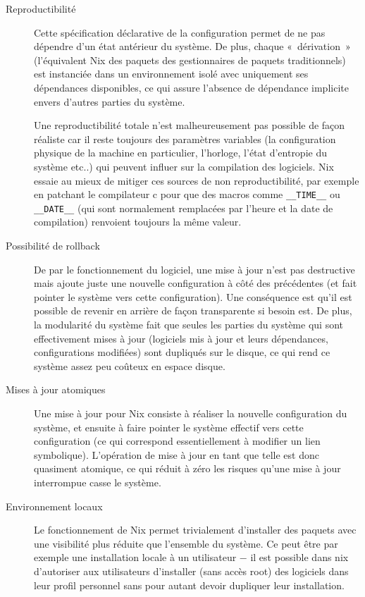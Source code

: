 \begin{description}
  \item[Reproductibilité] Cette spécification déclarative de la configuration
    permet de ne pas dépendre d'un état antérieur du système.
    De plus, chaque « dérivation » (l'équivalent Nix des paquets des
    gestionnaires de paquets traditionnels) est instanciée dans un
    environnement isolé avec uniquement ses dépendances disponibles, ce qui
    assure l'absence de dépendance implicite envers d'autres parties du système.

    Une reproductibilité totale n'est malheureusement pas possible de façon
    réaliste car il reste toujours des paramètres variables (la configuration
    physique de la machine en particulier, l'horloge, l'état d'entropie du
    système etc..) qui peuvent influer sur la compilation des logiciels. Nix
    essaie au mieux de mitiger ces sources de non reproductibilité, par exemple
    en patchant le compilateur c pour que des macros comme \verb|__TIME__| ou
    \verb|__DATE__| (qui sont normalement remplacées par l'heure et la date de
    compilation) renvoient toujours la même valeur.

  \item[Possibilité de rollback] De par le fonctionnement du logiciel, une mise
    à jour n'est pas destructive mais ajoute juste une nouvelle configuration à
    côté des précédentes (et fait pointer le système vers cette configuration).
    Une conséquence est qu'il est possible de revenir en arrière de façon
    transparente si besoin est.
    De plus, la modularité du système fait que seules les parties du système
    qui sont effectivement mises à jour (logiciels mis à jour et leurs
    dépendances, configurations modifiées) sont dupliqués sur le disque, ce qui
    rend ce système assez peu coûteux en espace disque.

  \item[Mises à jour atomiques] Une mise à jour pour Nix consiste à réaliser la
    nouvelle configuration du système, et ensuite à faire pointer le système
    effectif vers cette configuration (ce qui correspond essentiellement à
    modifier un lien symbolique). L'opération de mise à jour en tant que
    telle est donc quasiment atomique, ce qui réduit à zéro les risques qu'une
    mise à jour interrompue casse le système.

  \item[Environnement locaux] Le fonctionnement de Nix permet trivialement
    d'installer des paquets avec une visibilité plus réduite que l'ensemble du
    système. Ce peut être par exemple une installation locale à un utilisateur
    − il est possible dans nix d'autoriser aux utilisateurs d'installer (sans
    accès root) des logiciels dans leur profil personnel sans pour autant
    devoir dupliquer leur installation.


\end{description}
